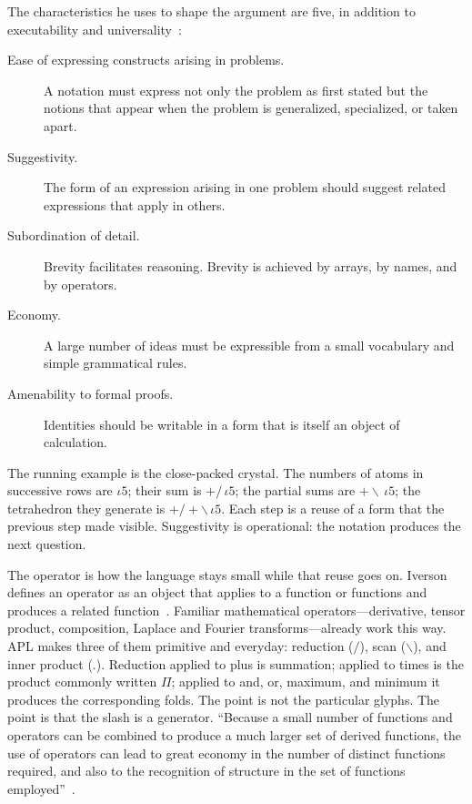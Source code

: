 \documentclass[manuscript, review, anonymous]{acmart}
\begin{document}
The characteristics he uses to shape the argument are five, in addition to executability and universality~\cite{Iverson1980Notation}:

\begin{description}
\item[Ease of expressing constructs arising in problems.] A notation must express not only the problem as first stated but the notions that appear when the problem is generalized, specialized, or taken apart.
\item[Suggestivity.] The form of an expression arising in one problem should suggest related expressions that apply in others.
\item[Subordination of detail.] Brevity facilitates reasoning. Brevity is achieved by arrays, by names, and by operators.
\item[Economy.] A large number of ideas must be expressible from a small vocabulary and simple grammatical rules.
\item[Amenability to formal proofs.] Identities should be writable in a form that is itself an object of calculation.
\end{description}

The running example is the close-packed crystal. The numbers of atoms in successive rows are $\iota 5$; their sum is $+/\,\iota 5$; the partial sums are $+\backslash\,\iota 5$; the tetrahedron they generate is $+/+\backslash\,\iota 5$. Each step is a reuse of a form that the previous step made visible. Suggestivity is operational: the notation produces the next question.

The operator is how the language stays small while that reuse goes on. Iverson defines an operator as an object that applies to a function or functions and produces a related function~\cite{Iverson1979Operators}. Familiar mathematical operators---derivative, tensor product, composition, Laplace and Fourier transforms---already work this way. APL makes three of them primitive and everyday: reduction ($/ $), scan ($\backslash$), and inner product ($.$). Reduction applied to plus is summation; applied to times is the product commonly written $\Pi$; applied to and, or, maximum, and minimum it produces the corresponding folds. The point is not the particular glyphs. The point is that the slash is a generator. ``Because a small number of functions and operators can be combined to produce a much larger set of derived functions, the use of operators can lead to great economy in the number of distinct functions required, and also to the recognition of structure in the set of functions employed''~\cite{Iverson1979Operators}.
\end{document}
